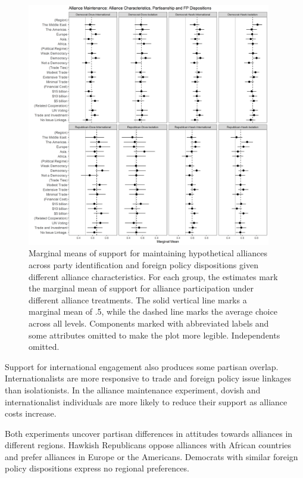 \documentclass[12pt]{article}
\begin{document}
\begin{figure}
	\centering
		\includegraphics[width=0.95\textwidth]{../figures/party-dispo-main-char.png}
	\caption{Marginal means of support for maintaining hypothetical alliances across party identification and foreign policy dispositions given different alliance characteristics. For each group, the estimates mark the marginal mean of support for alliance participation under different alliance treatments. The solid vertical line marks a marginal mean of .5, while the dashed line marks the average choice across all levels. Components marked with abbreviated labels and some attributes omitted to make the plot more legible. Independents omitted.}
	\label{fig:party-dispo-main-char}
\end{figure}


Support for international engagement also produces some partisan overlap. 
Internationalists are more responsive to trade and foreign policy issue linkages than isolationists. 
In the alliance maintenance experiment, dovish and internationalist individuals are more likely to reduce their support as alliance costs increase.


Both experiments uncover partisan differences in attitudes towards alliances in different regions. 
Hawkish Republicans oppose alliances with African countries and prefer alliances in Europe or the Americans. 
Democrats with similar foreign policy dispositions express no regional preferences.  
\end{document}
